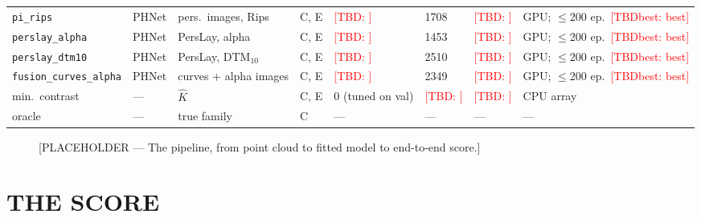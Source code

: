 \documentclass[twoside]{article}
\newcommand{\TBD}[1]{\textcolor{red}{[TBD\ifx\relax#1\relax\else: #1\fi]}}
\begin{document}
\begin{table}[t]
\begin{center}
\begin{tabular}{@{}llllllll@{}}
\texttt{pi\_rips}             & PHNet  & pers.\ images, Rips            & C, E & \TBD{} & 1708 & \TBD{} & GPU; $\le$200 ep.\ \TBD{best} \\
\texttt{perslay\_alpha}       & PHNet  & PersLay, alpha                 & C, E & \TBD{} & 1453 & \TBD{} & GPU; $\le$200 ep.\ \TBD{best} \\
\texttt{perslay\_dtm10}       & PHNet  & PersLay, DTM$_{10}$            & C, E & \TBD{} & 2510 & \TBD{} & GPU; $\le$200 ep.\ \TBD{best} \\
\texttt{fusion\_curves\_alpha}& PHNet  & curves + alpha images          & C, E & \TBD{} & 2349 & \TBD{} & GPU; $\le$200 ep.\ \TBD{best} \\
\midrule
min.\ contrast                & ---    & $\hat K$                       & C, E & 0 (tuned on val) & \TBD{} & \TBD{} & CPU array \\
oracle                        & ---    & true family                    & C    & ---    & ---  & ---    & --- \\
\bottomrule
\end{tabular}
\end{center}
\end{table}

\begin{figure}[t]
\vspace{.3in}
\centerline{}
\vspace{.3in}
\caption{[PLACEHOLDER — The pipeline, from point cloud to fitted model to end-to-end score.]}
\label{fig:pipeline}
\end{figure}

\section{THE SCORE}
\end{document}
